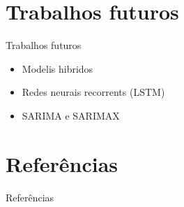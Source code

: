 \documentclass[compress,aspectratio=149,brazil]{beamer}
\begin{document}

\section{Trabalhos futuros}

\begin{frame}{Trabalhos futuros}
    \begin{itemize}
        \item Modelis hibridos
        \item Redes neurais recorrents (LSTM)
        \item SARIMA e SARIMAX
    \end{itemize}
\end{frame}

\section{Referências}

\begin{frame}[allowframebreaks]{Referências}
    \nocite{box}
    \nocite{ehlers}
    \nocite{zhang}
    
    
\end{frame}
\end{document}
